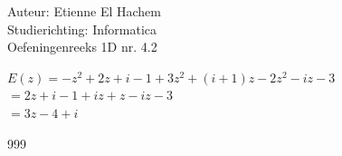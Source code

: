 \documentclass[a4paper]{article}
\begin{document}
  
\noindent \large Auteur: Etienne El Hachem \\
\noindent \large Studierichting: Informatica\\
\noindent \large Oefeningenreeks 1D nr. 4.2\\

\medskip

\normalsize

$E(z) = -z^2 + 2z + i - 1 + 3z^2 + (i + 1)z - 2z^2 - iz -3 $\\

$= 2z + i - 1 + iz + z - iz -3 $\\

$= 3z - 4 + i$

\begin{thebibliography}{999}
\end{thebibliography}
\end{document}
